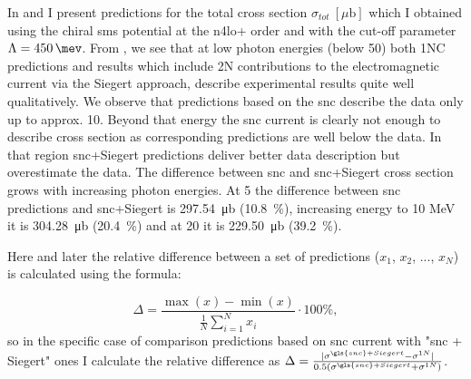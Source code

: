     In  and  
    I present predictions for the
    total cross section $\sigma_{tot}~[\mu\text{b}]$ which I obtained
    using the chiral \gls{sms} potential at the \gls{n4lo+} order and with 
    the cut-off parameter $\Lambda=\SI{450}{\mev}$.
    From , we see that at low photon energies
    (below \SI{50}{\mev})
    both 1NC predictions and results which include 2N contributions
    to the electromagnetic current
    via the Siegert approach, describe experimental results quite well qualitatively.
    We observe that predictions based on the \gls{snc} describe the data 
    only up to approx. \SI{10}{\mev}.
    Beyond that energy
    the \gls{snc} current is clearly not enough
    to describe cross section 
    as corresponding predictions are well below the data.
    In that region \gls{snc}+Siegert predictions deliver better data description but 
    overestimate the data.
    The difference between \gls{snc} and \gls{snc}+Siegert cross section grows with increasing photon energies.
    At \SI{5}{\mev} the difference between \gls{snc} predictions
    and \gls{snc}+Siegert is \SI{297.54}{\micro\barn} (\SI{10.8}{\percent}), increasing energy to 10 MeV
    it is \SI{304.28}{\micro\barn} (\SI{20.4}{\percent})
    and at \SI{20}{\mev} it is \SI{229.50}{\micro\barn} (\SI{39.2}{\percent}).
    
    Here and later the relative difference between a set of predictions ($x_1$, $x_2$, ..., $x_N$) is calculated
    using the formula:

    \begin{equation}
        \Delta = \frac{\max(x) - \min(x)}{\frac{1}{N}\sum_{i=1}^N x_i} \cdot 100\%,
        \label{eq:relative_diff}
    \end{equation}
    so in the specific case of comparison predictions based on \gls{snc} current with "\gls{snc} + Siegert" ones I
    calculate the relative difference as 
    $\Delta = \frac{|\sigma^{\gls{snc}+Siegert} - \sigma^{1N}|}{0.5(\sigma^{\gls{snc}+Siegert} + \sigma^{1N})}$.
    
